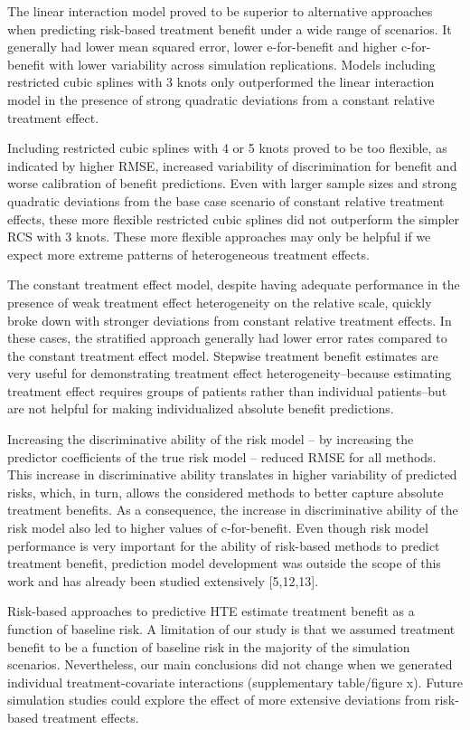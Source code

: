 \documentclass{article}
\begin{document}
The linear interaction model proved to be superior to alternative
approaches when predicting risk-based treatment benefit under a wide
range of scenarios. It generally had lower mean squared error, lower
e-for-benefit and higher c-for-benefit with lower variability across
simulation replications. Models including restricted cubic splines with
3 knots only outperformed the linear interaction model in the presence
of strong quadratic deviations from a constant relative treatment
effect.

Including restricted cubic splines with 4 or 5 knots proved to be too
flexible, as indicated by higher RMSE, increased variability of
discrimination for benefit and worse calibration of benefit predictions.
Even with larger sample sizes and strong quadratic deviations from the
base case scenario of constant relative treatment effects, these more
flexible restricted cubic splines did not outperform the simpler RCS
with 3 knots. These more flexible approaches may only be helpful if we
expect more extreme patterns of heterogeneous treatment effects.

The constant treatment effect model, despite having adequate performance
in the presence of weak treatment effect heterogeneity on the relative
scale, quickly broke down with stronger deviations from constant
relative treatment effects. In these cases, the stratified approach
generally had lower error rates compared to the constant treatment
effect model. Stepwise treatment benefit estimates are very useful for
demonstrating treatment effect heterogeneity--because estimating
treatment effect requires groups of patients rather than individual
patients--but are not helpful for making individualized absolute benefit
predictions.

Increasing the discriminative ability of the risk model -- by increasing
the predictor coefficients of the true risk model -- reduced RMSE for
all methods. This increase in discriminative ability translates in
higher variability of predicted risks, which, in turn, allows the
considered methods to better capture absolute treatment benefits. As a
consequence, the increase in discriminative ability of the risk model
also led to higher values of c-for-benefit. Even though risk model
performance is very important for the ability of risk-based methods to
predict treatment benefit, prediction model development was outside the
scope of this work and has already been studied extensively
{[}5,12,13{]}.

Risk-based approaches to predictive HTE estimate treatment benefit as a
function of baseline risk. A limitation of our study is that we assumed
treatment benefit to be a function of baseline risk in the majority of
the simulation scenarios. Nevertheless, our main conclusions did not
change when we generated individual treatment-covariate interactions
(supplementary table/figure x). Future simulation studies could explore
the effect of more extensive deviations from risk-based treatment
effects.
\end{document}
